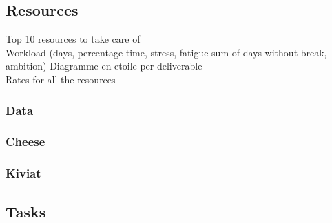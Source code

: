 \documentclass[8pt]{article} %
\begin{document}
\subsection{Resources}

Top 10 resources to take care of\\
Workload (days, percentage time, stress, fatigue sum of days without break, ambition)
Diagramme en etoile per deliverable\\
Rates for all the resources

\subsubsection{Data}


%
\subsubsection{Cheese}



\subsubsection{Kiviat}




\subsection{Tasks}
\end{document}
